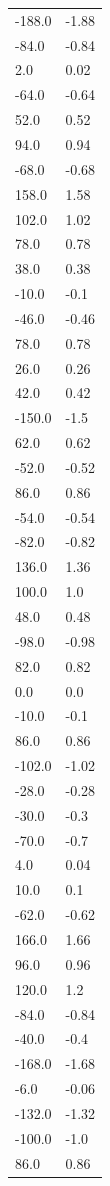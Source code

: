 \begin{longtable}{ll}
-188.0 & -1.88 \\
-84.0 & -0.84 \\
2.0 & 0.02 \\
-64.0 & -0.64 \\
52.0 & 0.52 \\
94.0 & 0.94 \\
-68.0 & -0.68 \\
158.0 & 1.58 \\
102.0 & 1.02 \\
78.0 & 0.78 \\
38.0 & 0.38 \\
-10.0 & -0.1 \\
-46.0 & -0.46 \\
78.0 & 0.78 \\
26.0 & 0.26 \\
42.0 & 0.42 \\
-150.0 & -1.5 \\
62.0 & 0.62 \\
-52.0 & -0.52 \\
86.0 & 0.86 \\
-54.0 & -0.54 \\
-82.0 & -0.82 \\
136.0 & 1.36 \\
100.0 & 1.0 \\
48.0 & 0.48 \\
-98.0 & -0.98 \\
82.0 & 0.82 \\
0.0 & 0.0 \\
-10.0 & -0.1 \\
86.0 & 0.86 \\
-102.0 & -1.02 \\
-28.0 & -0.28 \\
-30.0 & -0.3 \\
-70.0 & -0.7 \\
4.0 & 0.04 \\
10.0 & 0.1 \\
-62.0 & -0.62 \\
166.0 & 1.66 \\
96.0 & 0.96 \\
120.0 & 1.2 \\
-84.0 & -0.84 \\
-40.0 & -0.4 \\
-168.0 & -1.68 \\
-6.0 & -0.06 \\
-132.0 & -1.32 \\
-100.0 & -1.0 \\
86.0 & 0.86 \\

\end{longtable}
